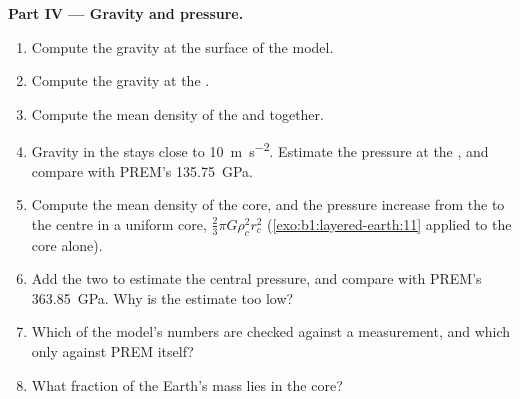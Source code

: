 \begin{problem}
\noindent\textbf{Part IV --- Gravity and pressure.}
\begin{enumerate}[resume]
  \item Compute the gravity at the surface of the model.
  \item Compute the gravity at the .
  \item Compute the mean density of the  and  together.
  \item Gravity in the  stays close to \qty{10}{m.s^{-2}}. Estimate the
        pressure at the , and compare with PREM's
        \qty{135.75}{GPa}.
  \item Compute the mean density of the core, and the pressure increase from
        the  to the centre in a uniform core,
        $\tfrac23\pi G\rho_c^2 r_c^2$ (\cref{exo:b1:layered-earth:11} applied to the core alone).
  \item Add the two to estimate the central pressure, and compare with PREM's
        \qty{363.85}{GPa}. Why is the estimate too low?
  \item Which of the model's numbers are checked against a measurement, and
        which only against PREM itself?
  \item What fraction of the Earth's mass lies in the core?
\end{enumerate}
\end{problem}
